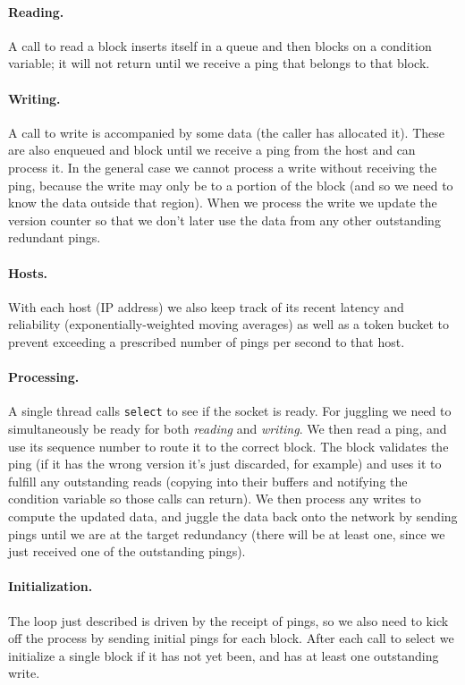 \documentclass[twocolumn]{article}
\begin{document}
\paragraph{Reading.} A call to read a block inserts itself in a queue
and then blocks on a condition variable; it will not return until we
receive a ping that belongs to that block.

\paragraph{Writing.} A call to write is accompanied by some data (the
caller has allocated it). These are also enqueued and block until
we receive a ping from the host and can process it. In the general
case we cannot process a write without receiving the ping, because
the write may only be to a portion of the block (and so we need to
know the data outside that region). When we process the write we
update the version counter so that we don't later use the data
from any other outstanding redundant pings.

\paragraph{Hosts.} With each host (IP address) we also keep track of
its recent latency and reliability (exponentially-weighted moving
averages) as well as a token bucket to prevent exceeding a prescribed
number of pings per second to that host.

\paragraph{Processing.} A single thread calls {\tt select} to see
if the socket is ready. For juggling we need to simultaneously be
ready for both {\em reading} and {\em writing}. We then read a ping,
and use its sequence number to route it to the correct block. The
block validates the ping (if it has the wrong version it's just
discarded, for example) and uses it to fulfill any outstanding reads
(copying into their buffers and notifying the condition variable so
those calls can return). We then process any writes to compute the
updated data, and juggle the data back onto the network by sending
pings until we are at the target redundancy (there will be at least
one, since we just received one of the outstanding pings).

\paragraph{Initialization.} The loop just described is driven by
the receipt of pings, so we also need to kick off the process by
sending initial pings for each block. After each call to select
we initialize a single block if it has not yet been, and has at
least one outstanding write.
\end{document}
